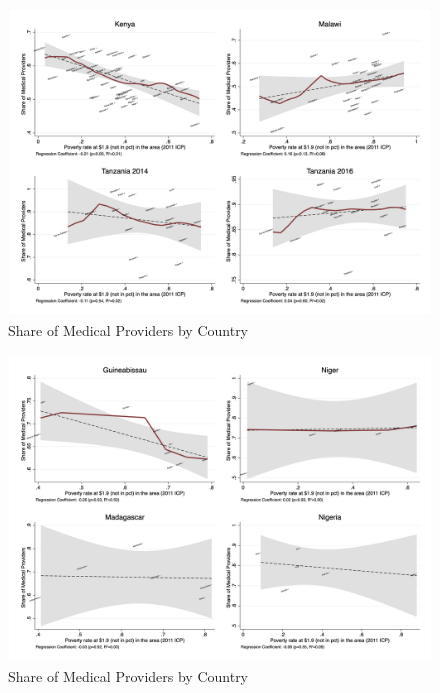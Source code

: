 \documentclass{article}                 %
\begin{document}
			\begin{figure}[H] 
				\centering
				\caption{Share of Medical Providers by Country} 
				\includegraphics[width=\textwidth]{"../Output/Final/poverty_fl_1"}
			\end{figure}
			
			\begin{figure}[H] 
				\centering
				\caption{Share of Medical Providers by Country} 
				\includegraphics[width=\textwidth]{"../Output/Final/poverty_fl_2"}
			\end{figure}
			
\end{document}
